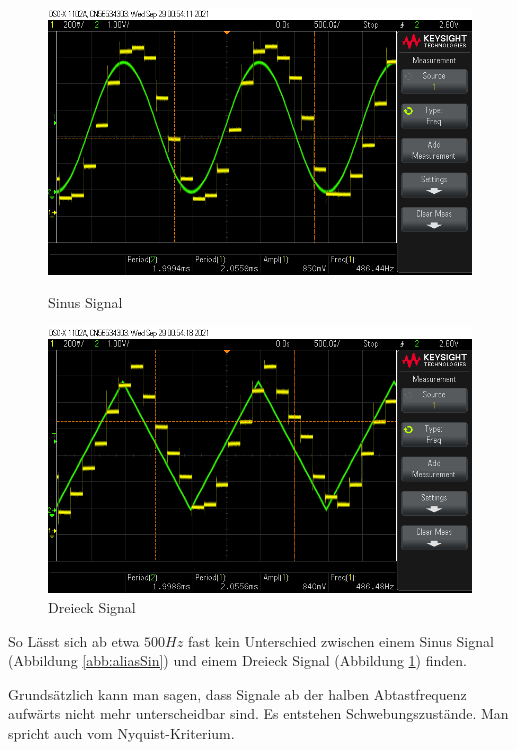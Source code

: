 \documentclass[12pt, a4paper, ngerman]{article}
\begin{document}
\begin{figure}%
  \centering
  \begin{minipage}[b]{0.49\textwidth} %
    \includegraphics[width=\textwidth]{scope_49.png}
    \caption{Sinus Signal}
    \label{abb:aliasSin}
  \end{minipage}
  \hfill
  \begin{minipage}[b]{0.49\textwidth}
    \includegraphics[width=\textwidth]{scope_50.png}
    \caption{Dreieck Signal}
    \label{abb:aliasTri}
  \end{minipage}
\end{figure}

So Lässt sich ab etwa $500Hz$ fast kein Unterschied
zwischen einem Sinus Signal (Abbildung \ref{abb:aliasSin})
und einem Dreieck Signal (Abbildung \ref{abb:aliasTri}) finden.

Grundsätzlich kann man sagen,
dass Signale ab der halben Abtastfrequenz aufwärts nicht mehr unterscheidbar sind.
Es entstehen Schwebungszustände. Man spricht auch vom Nyquist-Kriterium.
\end{document}
